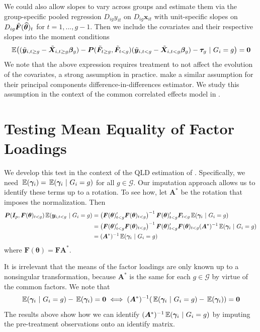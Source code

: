 \documentclass[12pt]{article}
\begin{document}
We could also allow slopes to vary across groups and estimate them via the group-specific pooled regression $D_{ig} y_{it}$ on $D_{ig} \bm x_{it}$ with unit-specific slopes on $D_{ig} \Tilde{\bm{F}}(\widehat{\bm{\theta}})_t$ for $t = 1,..., g-1$. Then we include the covariates and their respective slopes into the moment conditions
\begin{equation}
    \expec{(\tilde{\bm y}_{i,t\geq g} - \tilde{\bm X}_{i, t \geq g} \bm \beta_g) - \bm P(\tilde{\bm{F}}_{t \geq g}, \tilde{\bm{F}}_{t < g}) (\tilde{\bm y}_{i,t< g} - \tilde{\bm X}_{i, t < g} \bm \beta_g) - \bm \tau_g  }{G_i = g} = \bm 0
\end{equation}
We note that the above expression requires treatment to not affect the evolution of the covariates, a strong assumption in practice. \citet{Chan_and_Kwok_2022} make a similar assumption for their principal components difference-in-differences estimator. We study this assumption in the context of the common correlated effects model in \citet{Brown_Butts_Westerlund_2023}.


\section{Testing Mean Equality of Factor Loadings}

We develop this test in the context of the QLD estimation of \citet{Ahn_Lee_Schmidt_2013}. Specifically, we need $\expec{\bm \gamma_i} = \expec{\bm \gamma_i}{G_i = g}$ for all $g \in \mathcal{G}$. Our imputation approach allows us to identify these terms up to a rotation. To see how, let $\bm A^*$ be the rotation that imposes the \citet{Ahn_Lee_Schmidt_2013} normalization. Then
\begin{align*}
    \bm P(\bm I_{p}, \bm{F}(\bm{\theta})_{t < g}) \expec{\bm y_{i, t < g}}{G_i = g} 
    &= \left( \bm{F}(\bm{\theta})_{t < g}' \bm{F}(\bm{\theta})_{t < g} \right)^{-1} \bm{F}(\bm{\theta})_{t < g}' \bm{F}_{t < g} \expec{\bm \gamma_i}{G_i = g}\\
    &= \left( \bm{F}(\bm{\theta})_{t < g}' \bm{F}(\bm{\theta})_{t < g} \right)^{-1} \bm{F}(\bm{\theta})_{t < g}' \bm{F}(\bm{\theta})_{t < g} (\bm A^*)^{-1} \expec{\bm \gamma_i}{G_i = g}\\
    &= (\bm A^*)^{-1} \expec{\bm \gamma_i}{G_i = g}
\end{align*}
where $\bm{F}(\bm{\theta}) = \bm{F} \bm A^*$.

It is irrelevant that the means of the factor loadings are only known up to a nonsingular transformation, because $\bm A^*$ is the same for each $g \in \mathcal{G}$ by virtue of the common factors. We note that
\begin{equation}
    \expec{\bm \gamma_i}{G_i = g} - \expec{\bm \gamma_i} = \bm 0 \iff (\bm A^*)^{-1}(\expec{\bm \gamma_i}{G_i = g} - \expec{\bm \gamma_i}) = \bm 0
\end{equation}
The results above show how we can identify $(\bm A^*)^{-1} \expec{\bm \gamma_i}{G_i = g}$ by imputing the pre-treatment observations onto an identify matrix. 
\end{document}
